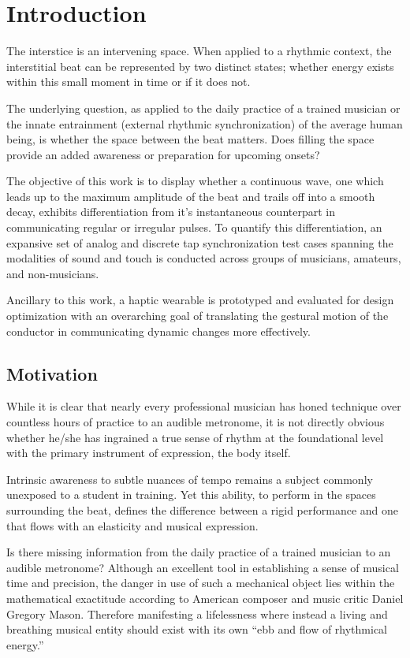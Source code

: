 
\chapter{Introduction} \label{secIntro}
The interstice is an intervening space. When applied to a rhythmic context, the interstitial beat can be represented by two distinct states; whether energy exists within this small moment in time or if it does not. 

The underlying question, as applied to the daily practice of a trained musician or the innate entrainment (external rhythmic synchronization) of the average human being, is whether the space between the beat matters. Does filling the space provide an added awareness or preparation for upcoming onsets?

The objective of this work is to display whether a continuous wave, one which leads up to the maximum amplitude of the beat and trails off into a smooth decay, exhibits differentiation from it's instantaneous counterpart in communicating regular or irregular pulses. To quantify this differentiation, an expansive set of analog and discrete tap synchronization test cases spanning the modalities of sound and touch is conducted across groups of musicians, amateurs, and non-musicians.

Ancillary to this work, a haptic wearable is prototyped and evaluated for design optimization with an overarching goal of translating the gestural motion of the conductor in communicating dynamic changes more effectively.
\section{Motivation}
While it is clear that nearly every professional musician has honed technique over countless hours of practice to an audible metronome, it is not directly obvious whether he/she has ingrained a true sense of rhythm at the foundational level with the primary instrument of expression, the body itself.

Intrinsic awareness to subtle nuances of tempo remains a subject commonly unexposed to a student in training. Yet this ability, to perform in the spaces surrounding the beat, defines the difference between a rigid performance and one that flows with an elasticity and musical expression.

Is there missing information from the daily practice of a trained musician to an audible metronome? Although an excellent tool in establishing a sense of musical time and precision, the danger in use of such a mechanical object lies within the mathematical exactitude according to American composer and music critic Daniel Gregory Mason. Therefore manifesting a lifelessness where instead a living and breathing musical entity should exist with its own ``ebb and flow of rhythmical energy.''\cite{fitts2008new}

